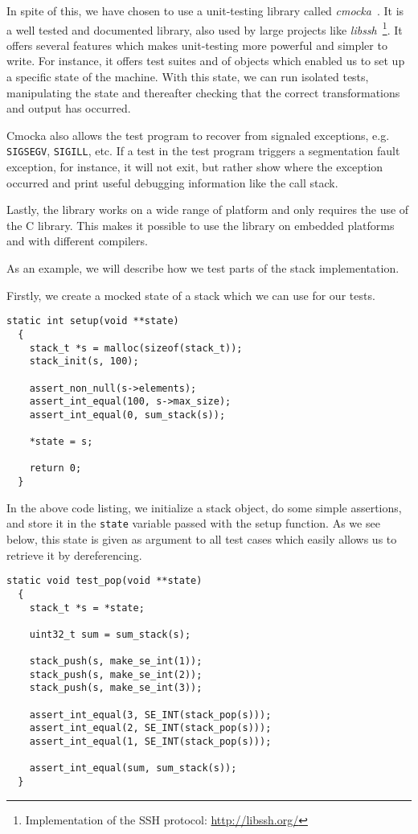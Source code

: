 In spite of this, we have chosen to use a unit-testing library called {\it
  cmocka}~\cite{cmocka}. It is a well tested and documented library, also used
by large projects like {\it libssh}~\footnote{Implementation of the SSH protocol:
  \url{http://libssh.org/}}. It offers several features which makes unit-testing
more powerful and simpler to write. For instance, it offers test suites and
 of objects which enabled us to set up a specific state of the
machine. With this state, we can run isolated tests, manipulating the state and
thereafter checking that the correct transformations and output has occurred.

Cmocka also allows the test program to recover from signaled exceptions,
e.g. {\tt SIGSEGV}, {\tt SIGILL}, etc. If a test in the test program triggers a
segmentation fault exception, for instance, it will not exit, but rather show
where the exception occurred and print useful debugging information like the
call stack.

Lastly, the library works on a wide range of platform and only requires the use
of the C library. This makes it possible to use the library on embedded
platforms and with different compilers.

As an example, we will describe how we test parts of the stack implementation.

Firstly, we create a mocked state of a stack which we can use for our tests.
\begin{lstlisting}[language={[ANSI]C},caption={Unit-test setup procedure}]
  static int setup(void **state)
  {
    stack_t *s = malloc(sizeof(stack_t));
    stack_init(s, 100);

    assert_non_null(s->elements);
    assert_int_equal(100, s->max_size);
    assert_int_equal(0, sum_stack(s));

    *state = s;

    return 0;
  }
\end{lstlisting}

In the above code listing, we initialize a stack object, do some
simple assertions, and store it in the {\tt state} variable passed
with the setup function. As we see below, this state is given as
argument to all test cases which easily allows us to retrieve it by
dereferencing.
\begin{lstlisting}[language={[ANSI]C},caption={Unit-test of {\tt stack\_pop}}]
  static void test_pop(void **state)
  {
    stack_t *s = *state;

    uint32_t sum = sum_stack(s);

    stack_push(s, make_se_int(1));
    stack_push(s, make_se_int(2));
    stack_push(s, make_se_int(3));

    assert_int_equal(3, SE_INT(stack_pop(s)));
    assert_int_equal(2, SE_INT(stack_pop(s)));
    assert_int_equal(1, SE_INT(stack_pop(s)));

    assert_int_equal(sum, sum_stack(s));
  }
\end{lstlisting}

